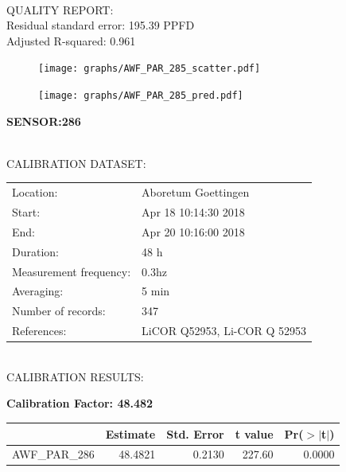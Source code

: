 \documentclass[oneside]{report}
\begin{document}
\hrulefill\\
QUALITY REPORT:\\
Residual standard error: 195.39 PPFD\\
Adjusted R-squared: 0.961



\begin{figure}[H]
  \centering
  \texttt{[image: graphs/AWF\_PAR\_285\_scatter.pdf]}
\end{figure}




\begin{figure}[H]
  \centering
  \texttt{[image: graphs/AWF\_PAR\_285\_pred.pdf]}
\end{figure}

\pagebreak


\begin{center}
\large{\textbf{SENSOR:286}}\\
\end{center}

\hrulefill\\
CALIBRATION DATASET:\\
\begin{table}[h!]
  \centering
  \label{tab:table1}
  \begin{tabular}{ll}
    Location: & Aboretum Goettingen\\ 
    
    
    Start:  & Apr 18 10:14:30 2018 \\
    End:   & Apr 20 10:16:00 2018\\ 
    Duration: & 48 h\\
    Measurement frequency: & 0.3hz\\
    Averaging:  &5 min\\
    Number of records: & 347 \\
    References: & LiCOR Q52953, Li-COR Q 52953 \\
  \end{tabular}
\end{table}

\hrulefill\\
CALIBRATION RESULTS:\\


\begin{center}
\textbf{\large{Calibration Factor: 48.482}}\\
\end{center}
\begin{table}[ht]
\centering
\begin{tabular}{rrrrr}
  \hline
 & Estimate & Std. Error & t value & Pr($>$$|$t$|$) \\ 
  \hline
AWF\_PAR\_286 & 48.4821 & 0.2130 & 227.60 & 0.0000 \\ 
   \hline
\end{tabular}
\end{table}
\end{document}
